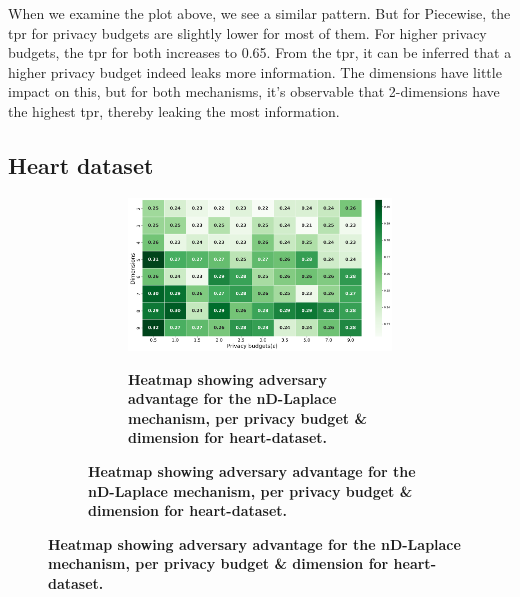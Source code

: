 {\begin{figure}[H]
\begin{subfigure}[b]{0.75\textwidth}
\begin{subfigure}[c]{1\textwidth}
            \label{fig:privacy_tpr_seeds-dataset_adversial_advantage_piecewise}
        \end{subfigure}
    \end{subfigure}
\end{figure}
When we examine the plot above, we see a similar pattern. But for Piecewise, the \gls{tpr} for privacy budgets are slightly lower for most of them.
For higher privacy budgets, the \gls{tpr} for both increases to 0.65.
From the \gls{tpr}, it can be inferred that a higher privacy budget indeed leaks more information.
The dimensions have little impact on this, but for both mechanisms, it's observable that 2-dimensions have the highest \gls{tpr}, thereby leaking the most information.

\newpage
\subsection{Heart dataset}
\begin{figure}[H]
  \centering
  \begin{subfigure}[b]{0.75\textwidth}
    \begin{subfigure}[c]{1\textwidth}
      \caption{\textbf{Heatmap showing adversary advantage for the nD-Laplace mechanism, per privacy budget \& dimension for heart-dataset.}}
      \includegraphics[width=1\textwidth]{Results/nd-laplace/nd-Laplace/heart-dataset/attack_adv.png}
      \label{fig:privacy_heart-dataset_adversial_advantage_kd-laplace}
    \end{subfigure}
    \vfill %


\end{subfigure}
\end{figure}}
